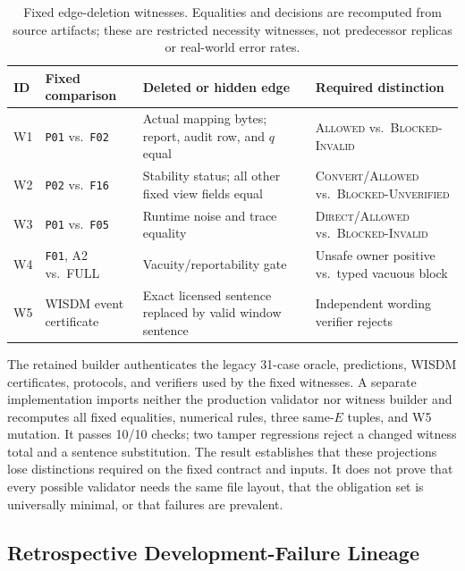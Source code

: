 \documentclass[letterpaper]{article} %
\newcommand{\Direct}{\textsc{Direct}}
\newcommand{\Convert}{\textsc{Convert}}
\newcommand{\Allowed}{\textsc{Allowed}}
\begin{document}
\begin{table}[t]
\centering
\small
\setlength{\tabcolsep}{4pt}
\begin{tabular}{p{}p{}p{}p{}}
\toprule
ID & Fixed comparison & Deleted or hidden edge & Required distinction \\
\midrule
W1 & \texttt{P01} vs.\ \texttt{F02} & Actual mapping bytes; report, audit row, and $q$ equal & \Allowed{} vs.\ \textsc{Blocked-Invalid} \\
W2 & \texttt{P02} vs.\ \texttt{F16} & Stability status; all other fixed view fields equal & \Convert{}/\Allowed{} vs.\ \textsc{Blocked-Unverified} \\
W3 & \texttt{P01} vs.\ \texttt{F05} & Runtime noise and trace equality & \Direct{}/\Allowed{} vs.\ \textsc{Blocked-Invalid} \\
W4 & \texttt{F01}, A2 vs.\ FULL & Vacuity/reportability gate & Unsafe owner positive vs.\ typed vacuous block \\
W5 & WISDM event certificate & Exact licensed sentence replaced by valid window sentence & Independent wording verifier rejects \\
\bottomrule
\end{tabular}
\caption{Fixed edge-deletion witnesses.  Equalities and decisions are
recomputed from source artifacts; these are restricted necessity witnesses,
not predecessor replicas or real-world error rates.}
\label{tab:supp-necessity-witnesses}
\end{table}

The retained builder authenticates the legacy 31-case oracle, predictions,
WISDM certificates, protocols, and verifiers used by the fixed witnesses.  A separate
implementation imports neither the production validator nor witness builder
and recomputes all fixed equalities, numerical rules, three same-$E$ tuples,
and W5 mutation.  It passes 10/10 checks; two tamper regressions reject a
changed witness total and a sentence substitution.  The result establishes
that these projections lose distinctions required on the fixed contract and
inputs.  It does not prove that every possible validator needs the same file
layout, that the obligation set is universally minimal, or that failures are
prevalent.

\subsection{Retrospective Development-Failure Lineage}
\end{document}
